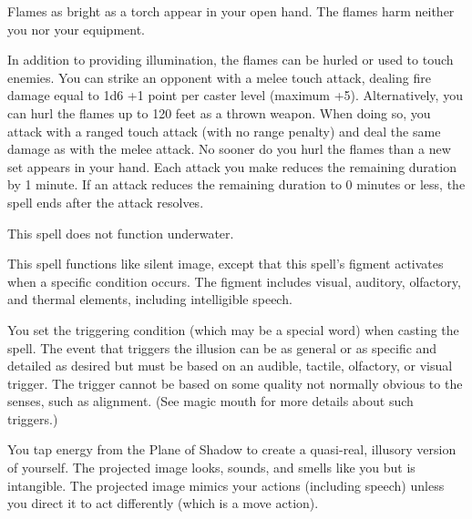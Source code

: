 \begin{multicols}{2}
\begin{small}
\noindent Flames as bright as a torch appear in your open hand. The flames harm neither you nor your equipment.

\smallskip\noindent In addition to providing illumination, the flames can be hurled or used to touch enemies. You can strike an opponent with a melee touch attack, dealing fire damage equal to 1d6 +1 point per caster level (maximum +5). Alternatively, you can hurl the flames up to 120 feet as a thrown weapon. When doing so, you attack with a ranged touch attack (with no range penalty) and deal the same damage as with the melee attack. No sooner do you hurl the flames than a new set appears in your hand. Each attack you make reduces the remaining duration by 1 minute. If an attack reduces the remaining duration to 0 minutes or less, the spell ends after the attack resolves.

\smallskip\noindent This spell does not function underwater.

\noindent This spell functions like silent image, except that this spell's figment activates when a specific condition occurs. The figment includes visual, auditory, olfactory, and thermal elements, including intelligible speech.

\smallskip\noindent You set the triggering condition (which may be a special word) when casting the spell. The event that triggers the illusion can be as general or as specific and detailed as desired but must be based on an audible, tactile, olfactory, or visual trigger. The trigger cannot be based on some quality not normally obvious to the senses, such as alignment. (See magic mouth for more details about such triggers.)


\noindent You tap energy from the Plane of Shadow to create a quasi-real, illusory version of yourself. The projected image looks, sounds, and smells like you but is intangible. The projected image mimics your actions (including speech) unless you direct it to act differently (which is a move action).


\end{small}
\end{multicols}
